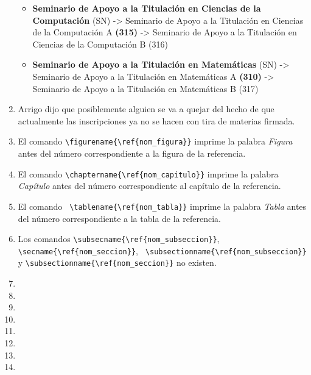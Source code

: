 \begin{appendices}
\begin{enumerate}
\begin{itemize}
  \item \textbf{Seminario de Apoyo a la Titulación en Ciencias de la Computación} (SN) -> Seminario de Apoyo a la Titulación en Ciencias de la Computación A \textbf{(315)} -> Seminario de Apoyo a la Titulación en Ciencias de la Computación B (316)
  
  \item \textbf{Seminario de Apoyo a la Titulación en Matemáticas} (SN) -> Seminario de Apoyo a la Titulación en Matemáticas A \textbf{(310)} -> Seminario de Apoyo a la Titulación en Matemáticas B (317)
  \end{itemize}%
  
	\item Arrigo dijo que posiblemente alguien se va a quejar del hecho de que actualmente las inscripciones ya no se hacen con tira de materias firmada.
  
  \item El comando \verb+\figurename{\ref{nom_figura}}+ imprime la palabra \textit{Figura} antes del número correspondiente a la figura de la referencia.
  
  \item El comando \verb+\chaptername{\ref{nom_capitulo}}+ imprime la palabra \textit{Capítulo} antes del número correspondiente al capítulo de la referencia.

  \item El comando \verb+ \tablename{\ref{nom_tabla}}+ imprime la palabra \textit{Tabla} antes del número correspondiente a la tabla de la referencia.
  
  \item Los comandos \verb+\subsecname{\ref{nom_subseccion}}+, \verb+ \secname{\ref{nom_seccion}}+, \verb+ \subsectionname{\ref{nom_subseccion}}+ y \verb+\subsectionname{\ref{nom_seccion}}+ no existen.
  
  \item 
  
  \item 
  
  \item 
  
  \item 
  
  \item 
  
  \item 
  
  \item 
  
  \item 
  

\end{enumerate}
\end{appendices}
